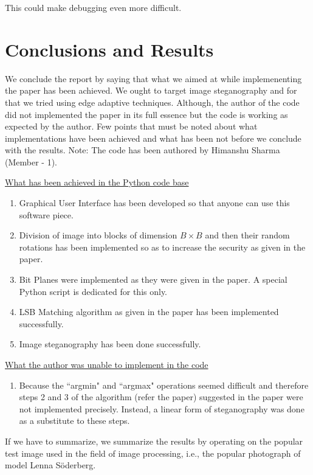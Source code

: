 \documentclass{report}
\begin{document}
This could make debugging even more difficult.

\section{Conclusions and Results}
We conclude the report by saying that what we aimed at while implemenenting the paper has been achieved. We ought to target image steganography and for that we tried using edge adaptive techniques. Although, the author of the code did not implemented the paper in its full essence but the code is working as expected by the author. Few points that must be noted about what implementations have been achieved and what has been not before we conclude with the results. Note: The code has been authored by Himanshu Sharma (Member - 1).

\underline{\large What has been achieved in the Python code base}
\begin{enumerate}
\item Graphical User Interface has been developed so that anyone can use this software piece.
\item Division of image into blocks of dimension $B \times B$ and then their random rotations has been implemented so as to increase the security as given in the paper.
\item Bit Planes were implemented as they were given in the paper. A special Python script is dedicated for this only.
\item LSB Matching algorithm as given in the paper has been implemented successfully.
\item Image steganography has been done successfully.
\end{enumerate}
\par
\underline{\large What the author was unable to implement in the code}
\begin{enumerate}
\item Because the ``argmin" and ``argmax" operations seemed difficult and therefore steps 2 and 3 of the algorithm (refer the paper) suggested in the paper were not implemented precisely. Instead, a linear form of steganography was done as a substitute to these steps.
\end{enumerate}
If we have to summarize, we summarize the results by operating on the popular test image used in the field of image processing, i.e., the popular photograph of model Lenna S\"{o}derberg.
\end{document}
